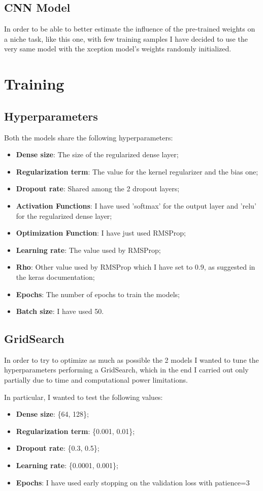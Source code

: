 \documentclass[a4paper]{article}
\begin{document}
\subsection{CNN Model}
In order to be able to better estimate the influence of the pre-trained weights on a niche task, like this one, with few training samples I have decided to use the very same model with the xception model's weights randomly initialized.
\newpage
\section{Training}
\subsection{Hyperparameters}
Both the models share the following hyperparameters:
\begin{itemize}
\item \textbf{Dense size}: The size of the regularized dense layer;
\item \textbf{Regularization term}: The value for the kernel regularizer and the bias one;
\item \textbf{Dropout rate}: Shared among the 2 dropout layers;
\item \textbf{Activation Functions}: I have used 'softmax' for the output layer and 'relu' for the regularized dense layer;
\item \textbf{Optimization Function}: I have just used RMSProp;
\item \textbf{Learning rate}: The value used by RMSProp;
\item \textbf{Rho}: Other value used by RMSProp which I have set to 0.9, as suggested in the keras documentation;
\item \textbf{Epochs}: The number of epochs to train the models;
\item \textbf{Batch size}: I have used 50.
\end{itemize}

\subsection{GridSearch}
In order to try to optimize as much as possible the 2 models I wanted to tune the hyperparameters performing a GridSearch, which in the end I carried out only partially due to time and computational power limitations.

In particular, I wanted to test the following values:
\begin{itemize}
\item \textbf{Dense size}: \{64, 128\};
\item \textbf{Regularization term}: \{0.001, 0.01\};
\item \textbf{Dropout rate}: \{0.3, 0.5\};
\item \textbf{Learning rate}: \{0.0001, 0.001\};
\item \textbf{Epochs}: I have used early stopping on the validation loss with patience=3
\end{itemize}
\end{document}
